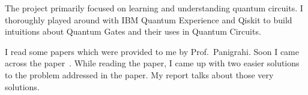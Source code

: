 \documentclass[main.tex]{subfiles}
\begin{document}
	
    The project primarily focused on learning and understanding quantum circuits. I thoroughly played around with IBM Quantum Experience and Qiskit to build intuitions about Quantum Gates and their uses in Quantum Circuits.

    I read some papers which were provided to me by Prof.\ Panigrahi. Soon I came across the paper~\cite{mahanti2019quantum}. While reading the paper, I came up with two easier solutions to the problem addressed in the paper. My report talks about those very solutions.
\end{document}
